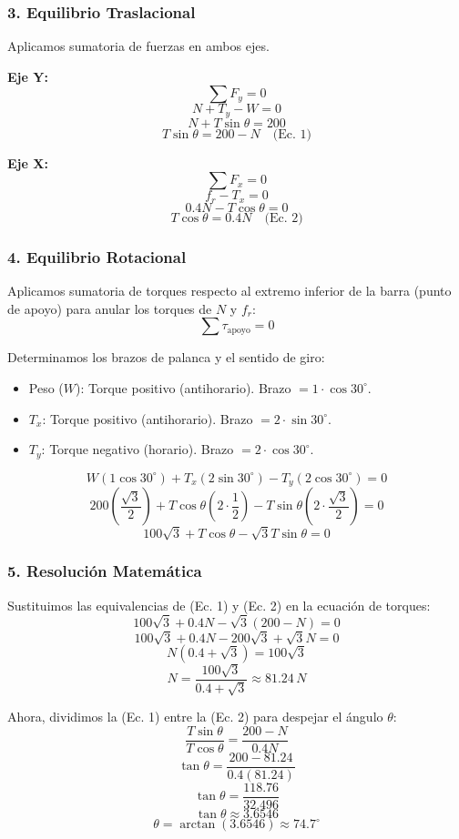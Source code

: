 \documentclass[12pt, a4paper]{article}
\begin{document}
\subsubsection*{3. Equilibrio Traslacional}
Aplicamos sumatoria de fuerzas en ambos ejes.

\textbf{Eje Y:}
$$\sum F_y = 0$$
$$N + T_y - W = 0$$
$$N + T \sin\theta = 200$$
$$T \sin\theta = 200 - N \quad \text{(Ec. 1)}$$

\textbf{Eje X:}
$$\sum F_x = 0$$
$$f_r - T_x = 0$$
$$0.4 N - T \cos\theta = 0$$
$$T \cos\theta = 0.4 N \quad \text{(Ec. 2)}$$

\subsubsection*{4. Equilibrio Rotacional}
Aplicamos sumatoria de torques respecto al extremo inferior de la barra (punto de apoyo) para anular los torques de $N$ y $f_r$:
$$\sum \tau_{\text{apoyo}} = 0$$

Determinamos los brazos de palanca y el sentido de giro:
\begin{itemize}
    \item Peso ($W$): Torque positivo (antihorario). Brazo $= 1 \cdot \cos 30^\circ$.
    \item $T_x$: Torque positivo (antihorario). Brazo $= 2 \cdot \sin 30^\circ$.
    \item $T_y$: Torque negativo (horario). Brazo $= 2 \cdot \cos 30^\circ$.
\end{itemize}

$$W (1 \cos 30^\circ) + T_x (2 \sin 30^\circ) - T_y (2 \cos 30^\circ) = 0$$
$$200 \left( \frac{\sqrt{3}}{2} \right) + T \cos\theta \left( 2 \cdot \frac{1}{2} \right) - T \sin\theta \left( 2 \cdot \frac{\sqrt{3}}{2} \right) = 0$$
$$100\sqrt{3} + T \cos\theta - \sqrt{3} T \sin\theta = 0$$

\subsubsection*{5. Resolución Matemática}
Sustituimos las equivalencias de (Ec. 1) y (Ec. 2) en la ecuación de torques:
$$100\sqrt{3} + 0.4 N - \sqrt{3} (200 - N) = 0$$
$$100\sqrt{3} + 0.4 N - 200\sqrt{3} + \sqrt{3} N = 0$$
$$N (0.4 + \sqrt{3}) = 100\sqrt{3}$$
$$N = \frac{100\sqrt{3}}{0.4 + \sqrt{3}} \approx 81.24 \, \si{N}$$

Ahora, dividimos la (Ec. 1) entre la (Ec. 2) para despejar el ángulo $\theta$:
$$\frac{T \sin\theta}{T \cos\theta} = \frac{200 - N}{0.4 N}$$
$$\tan\theta = \frac{200 - 81.24}{0.4(81.24)}$$
$$\tan\theta = \frac{118.76}{32.496}$$
$$\tan\theta \approx 3.6546$$
$$\theta = \arctan(3.6546) \approx 74.7^\circ$$
\end{document}

